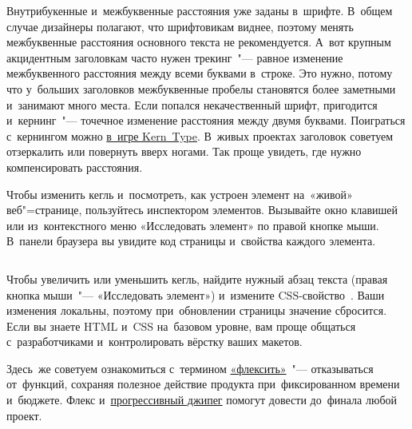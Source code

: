 Внутрибукенные и~межбуквенные расстояния уже заданы в~шрифте.
В~общем случае дизайнеры полагают, что шрифтовикам виднее, поэтому
менять межбуквенные расстояния основного текста не рекомендуется.
А~вот крупным акцидентным заголовкам часто нужен трекинг~"--- равное
изменение межбуквенного расстояния между всеми буквами в~строке. Это
нужно, потому что у~больших заголовков межбуквенные пробелы
становятся более заметными и~занимают много места. Если попался
некачественный шрифт, пригодится и~кернинг~"--- точечное изменение
расстояния между двумя буквами. Поиграться с~кернингом можно
\href{https://type.method.ac/}{в~игре Kern~Type}. В~живых проектах
заголовок советуем отзеркалить или повернуть вверх ногами. Так проще
увидеть, где нужно компенсировать расстояния.

Чтобы изменить кегль и~посмотреть, как устроен элемент на~«живой»
веб"=странице, пользуйтесь инспектором элементов. Вызывайте окно
клавишей~ или из~контекстного меню «Исследовать элемент»
по правой кнопке мыши. В~панели браузера вы увидите код страницы
и~свойства каждого элемента. 

\begin{codebox}
	\inputminted{html}{code/html_1.html}
\end{codebox}

Чтобы увеличить или уменьшить кегль, найдите нужный абзац текста
(правая кнопка мыши~"--- «Исследовать элемент») и~измените
CSS-свойство~. Ваши изменения локальны, поэтому
при~обновлении страницы значение сбросится. Если вы знаете HTML
и~CSS на~базовом уровне, вам проще общаться с~разработчиками
и~контролировать вёрстку ваших макетов. 

Здесь~же советуем ознакомиться с~термином
\href{https://bureau.ru/about/fff/}{«флексить»}~"---
отказываться от~функций, сохраняя полезное действие продукта
при~фиксированном времени и~бюджете. Флекс
и~\href{%
	https://www.artlebedev.ru/kovodstvo/sections/167/
}{прогрессивный джипег}
помогут довести до~финала любой проект. 


